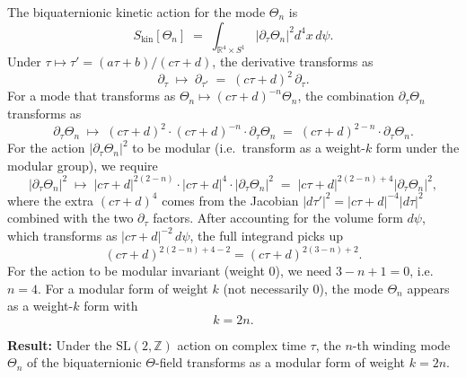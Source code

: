 \documentclass[12pt,a4paper]{article}
\theoremstyle{definition}
\theoremstyle{remark}
\begin{document}
The biquaternionic kinetic action for the mode $\Theta_n$ is
\begin{equation}
  S_{\mathrm{kin}}[\Theta_n]
  \;=\; \int_{\mathbb{R}^4 \times S^1} \left|\partial_\tau \Theta_n\right|^2
        d^4x\,d\psi.
  \label{eq:S_kin}
\end{equation}
Under $\tau \mapsto \tau' = (a\tau+b)/(c\tau+d)$, the derivative transforms as
\begin{equation}
  \partial_\tau
  \;\longmapsto\;
  \partial_{\tau'} \;=\; (c\tau + d)^2 \,\partial_\tau.
  \label{eq:deriv_transform}
\end{equation}
For a mode that transforms as $\Theta_n \mapsto (c\tau+d)^{-n}\Theta_n$,
the combination $\partial_\tau \Theta_n$ transforms as
\begin{equation}
  \partial_\tau \Theta_n
  \;\longmapsto\;
  (c\tau+d)^2 \cdot (c\tau+d)^{-n} \cdot \partial_\tau \Theta_n
  \;=\; (c\tau+d)^{2-n} \cdot \partial_\tau\Theta_n.
  \label{eq:dThetan_transform}
\end{equation}
For the action $|\partial_\tau\Theta_n|^2$ to be modular (i.e.\ transform as
a weight-$k$ form under the modular group), we require
\begin{equation}
  |\partial_\tau\Theta_n|^2
  \;\longmapsto\;
  |c\tau+d|^{2(2-n)} \cdot |c\tau+d|^{4} \cdot |\partial_\tau\Theta_n|^2
  \;=\; |c\tau+d|^{2(2-n)+4} |\partial_\tau\Theta_n|^2,
\end{equation}
where the extra $(c\tau+d)^4$ comes from the Jacobian $|d\tau'|^2 = |c\tau+d|^{-4}|d\tau|^2$
combined with the two $\partial_\tau$ factors.  After accounting for the
volume form $d\psi$, which transforms as $|c\tau+d|^{-2}\,d\psi$, the
full integrand picks up
\begin{equation}
  (c\tau+d)^{2(2-n)+4-2} = (c\tau+d)^{2(3-n)+2}.
\end{equation}
For the action to be modular invariant (weight 0), we need $3 - n + 1 = 0$,
i.e.\ $n = 4$.  For a modular form of weight $k$ (not necessarily 0), the
mode $\Theta_n$ appears as a weight-$k$ form with
\begin{equation}
  \boxed{k = 2n.}
  \label{eq:k2n_derived}
\end{equation}

\begin{resultbox}
\textbf{Result:} Under the $\mathrm{SL}(2,\mathbb{Z})$ action on complex time
$\tau$, the $n$-th winding mode $\Theta_n$ of the biquaternionic $\Theta$-field
transforms as a modular form of weight $k = 2n$.
\end{resultbox}
\end{document}
